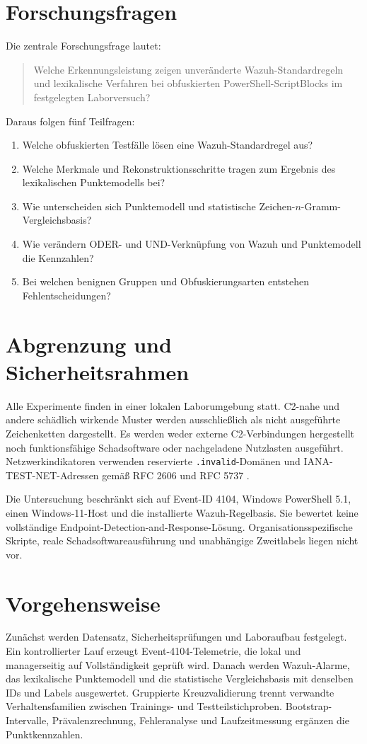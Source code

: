 \documentclass[12pt,a4paper,oneside,parskip=half]{scrreprt}
\begin{document}
\section{Forschungsfragen}
Die zentrale Forschungsfrage lautet:
\begin{quote}
Welche Erkennungsleistung zeigen unveränderte Wazuh-Standardregeln und lexikalische Verfahren bei obfuskierten PowerShell-ScriptBlocks im festgelegten Laborversuch?
\end{quote}

Daraus folgen fünf Teilfragen:
\begin{enumerate}[label=F\arabic*]
    \item Welche obfuskierten Testfälle lösen eine Wazuh-Standardregel aus?
    \item Welche Merkmale und Rekonstruktionsschritte tragen zum Ergebnis des lexikalischen Punktemodells bei?
    \item Wie unterscheiden sich Punktemodell und statistische Zeichen-\(n\)-Gramm-Vergleichsbasis?
    \item Wie verändern ODER- und UND-Verknüpfung von Wazuh und Punktemodell die Kennzahlen?
    \item Bei welchen benignen Gruppen und Obfuskierungsarten entstehen Fehlentscheidungen?
\end{enumerate}

\section{Abgrenzung und Sicherheitsrahmen}
Alle Experimente finden in einer lokalen Laborumgebung statt. C2-nahe und andere schädlich wirkende Muster werden ausschließlich als nicht ausgeführte Zeichenketten dargestellt. Es werden weder externe C2-Verbindungen hergestellt noch funktionsfähige Schadsoftware oder nachgeladene Nutzlasten ausgeführt. Netzwerkindikatoren verwenden reservierte \texttt{.invalid}-Domänen und IANA-TEST-NET-Adressen gemäß RFC 2606 und RFC 5737 \cite{rfc2606,rfc5737}.

Die Untersuchung beschränkt sich auf Event-ID 4104, Windows PowerShell 5.1, einen Windows-11-Host und die installierte Wazuh-Regelbasis. Sie bewertet keine vollständige Endpoint-Detection-and-Response-Lösung. Organisationsspezifische Skripte, reale Schadsoftwareausführung und unabhängige Zweitlabels liegen nicht vor.

\section{Vorgehensweise}
Zunächst werden Datensatz, Sicherheitsprüfungen und Laboraufbau festgelegt. Ein kontrollierter Lauf erzeugt Event-4104-Telemetrie, die lokal und managerseitig auf Vollständigkeit geprüft wird. Danach werden Wazuh-Alarme, das lexikalische Punktemodell und die statistische Vergleichsbasis mit denselben IDs und Labels ausgewertet. Gruppierte Kreuzvalidierung trennt verwandte Verhaltensfamilien zwischen Trainings- und Testteilstichproben. Bootstrap-Intervalle, Prävalenzrechnung, Fehleranalyse und Laufzeitmessung ergänzen die Punktkennzahlen.
\end{document}
